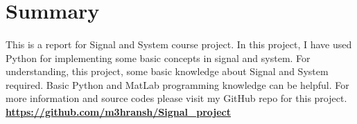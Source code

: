 \section*{Summary}
\paragraph{}
This is a report for Signal and System course project.
In this project, I have used Python for implementing 
some basic concepts in signal and system. 
For understanding, this project, some basic 
knowledge about Signal and System required. Basic 
Python and MatLab programming knowledge can be helpful.
For more information and source codes please 
visit my GitHub repo for this project.
\newline
\newline
\href{https://github.com/m3hransh/Signal_project}{\textbf{https://github.com/m3hransh/Signal\_project}}